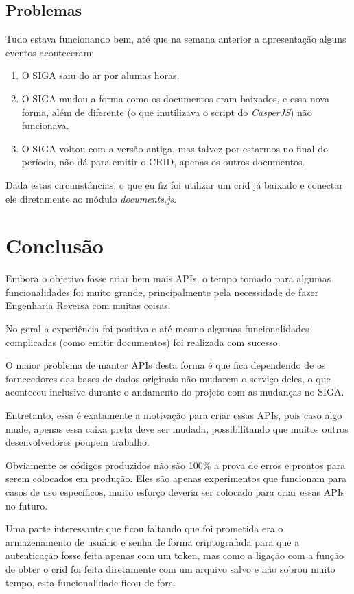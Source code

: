 \subsection{Problemas}

Tudo estava funcionando bem, até que na semana anterior a apresentação alguns eventos aconteceram:

\begin{enumerate}
  \item O SIGA saiu do ar por alumas horas.
  \item O SIGA mudou a forma como os documentos eram baixados, e essa nova forma, além de diferente (o que inutilizava o script do \textit{CasperJS}) não funcionava.
  \item O SIGA voltou com a versão antiga, mas talvez por estarmos no final do período, não dá para emitir o CRID, apenas os outros documentos.
\end{enumerate}

Dada estas circunstâncias, o que eu fiz foi utilizar um crid já baixado e conectar ele diretamente ao módulo \textit{documents.js}.

\section{Conclusão}

Embora o objetivo fosse criar bem mais APIs, o tempo tomado para algumas funcionalidades foi muito grande, principalmente pela necessidade de fazer Engenharia Reversa com muitas coisas.

No geral a experiência foi positiva e até mesmo algumas funcionalidades complicadas (como emitir documentos) foi realizada com sucesso.

O maior problema de manter APIs desta forma é que fica dependendo de os fornecedores das bases de dados originais não mudarem o serviço deles, o que aconteceu inclusive durante o andamento do projeto com as mudanças no SIGA.

Entretanto, essa é exatamente a motivação para criar essas APIs, pois caso algo mude, apenas essa caixa preta deve ser mudada, possibilitando que muitos outros desenvolvedores poupem trabalho.

Obviamente os códigos produzidos não são 100\% a prova de erros e prontos para serem colocados em produção. Eles são apenas experimentos que funcionam para casos de uso específicos, muito esforço deveria ser colocado para criar essas APIs no futuro.

Uma parte interessante que ficou faltando que foi prometida era o armazenamento de usuário e senha de forma criptografada para que a autenticação fosse feita apenas com um token, mas como a ligação com a função de obter o crid foi feita diretamente com um arquivo salvo e não sobrou muito tempo, esta funcionalidade ficou de fora.

